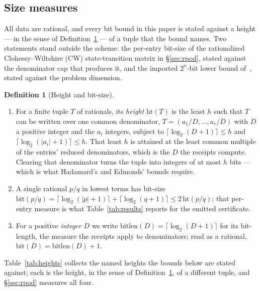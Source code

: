 \documentclass[11pt]{article}
\theoremstyle{definition}
\newtheorem{definition}{Definition}
\theoremstyle{remark}
\renewcommand{\_}{\ifdim\fontdimen3\font=0pt\relax\char`\_\else\textunderscore\fi\hspace{0pt}}
\begin{document}
\subsection{Size measures}\label{sec:sizes}
All data are rational, and every bit bound in this paper is stated against a
height --- in the sense of Definition~\ref{def:height} --- of a tuple that the
bound names. Two statements stand outside the scheme: the per-entry bit-size of
the rationalized Clohessy--Wiltshire (CW) state-transition matrix in
\S\ref{sec:rpod}, stated against the denominator cap that produces it, and the
imported $2^n$-bit lower bound of~\cite{bienstock2020}, stated against the
problem dimension.

\begin{definition}[Height and bit-size]\label{def:height}\leavevmode
\begin{enumerate}
\item[(a)] For a finite tuple $T$ of rationals, its \emph{height}
$\mathrm{ht}(T)$ is the least $h$ such that $T$ can be written over one common
denominator, $T=(a_1/D,\dots,a_r/D)$ with $D$ a positive integer and the $a_i$
integers, subject to $\lceil\log_2(D{+}1)\rceil\le h$ and
$\lceil\log_2(|a_i|{+}1)\rceil\le h$. That least $h$ is attained at the least
common multiple of the entries' reduced denominators, which is the $D$ the
receipts compute. Clearing that denominator turns the tuple into integers of
at most $h$ bits --- which is what Hadamard's and Edmonds' bounds require.
\item[(b)] A single rational $p/q$ in lowest terms has bit-size
$\mathrm{bit}(p/q)=\lceil\log_2(|p|{+}1)\rceil+\lceil\log_2(q{+}1)\rceil\le
2\,\mathrm{ht}(p/q)$; that per-entry measure is what Table~\ref{tab:results}
reports for the emitted certificate.
\item[(c)] For a positive \emph{integer} $D$ we write
$\mathrm{bitlen}(D)=\lceil\log_2(D{+}1)\rceil$ for its bit-length, the measure
the receipts apply to denominators; read as a rational,
$\mathrm{bit}(D)=\mathrm{bitlen}(D)+1$.
\end{enumerate}
\end{definition}

\noindent Table~\ref{tab:heights} collects the named heights the bounds below
are stated against; each is the height, in the sense of
Definition~\ref{def:height}, of a different tuple, and \S\ref{sec:rpod}
measures all four.
\end{document}
